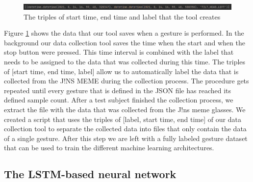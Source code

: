 \documentclass[runningheads]{llncs}
\begin{document}
\begin{figure}
\centering
\centerline{\includegraphics[width=\textwidth]{Label_Assignment.png}}
\caption{The triples of start time, end time and label that the tool creates}
\label{fig:labelTriple}
\end{figure}
\par
Figure \ref{fig:labelTriple} shows the data that our tool saves when a gesture is performed. In the background our data collection tool saves the time when the start and when the stop button were pressed. This time interval is combined with the label that needs to be assigned to the data that was collected during this time. The triples of [start time, end time, label] allow us to automatically label the data that is collected from the J!NS MEME during the collection process. The procedure gets repeated until every gesture that is defined in the JSON file has reached its defined sample count.
After a test subject finished the collection process, we extract the file with the data that was collected from the J!ns meme glasses. We created a script that uses the triples of [label, start time, end time] of our data collection tool to separate the collected data into files that only contain the data of a single gesture. After this step we are left with a fully labeled gesture dataset that can be used to train the different machine learning architectures.

\subsection{The LSTM-based neural network}
\end{document}
